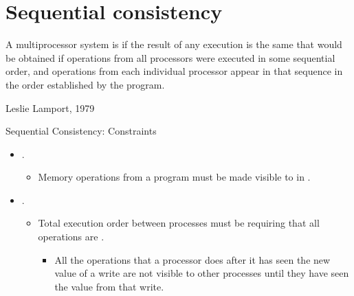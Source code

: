 \section{Sequential consistency}

\begin{frame}[t]
\makebox[\textwidth][c]{}
\begin{footnotesize}
A multiprocessor system is  if the result of any
execution is the same that would be obtained if operations from all processors
were executed in some sequential order, and operations from each individual
processor appear in that sequence in the order established by the program.
\begin{flushright}
Leslie Lamport, 1979
\end{flushright}
\end{footnotesize}
\end{frame}

\begin{frame}[t]{Sequential Consistency: Constraints}
\begin{itemize}
  \item {}.
    \begin{itemize}
      \item Memory operations from a program must be made visible to
             in
            .
    \end{itemize}

  \item {}.
    \begin{itemize}
      \item Total execution order between processes must be
             requiring that all operations are
            .
        \begin{itemize}
          \item All the operations that a processor does after it has seen the new value of a write
                are not visible to other processes until they have seen the value from that write.
        \end{itemize}
    \end{itemize}
\end{itemize}
\end{frame}

